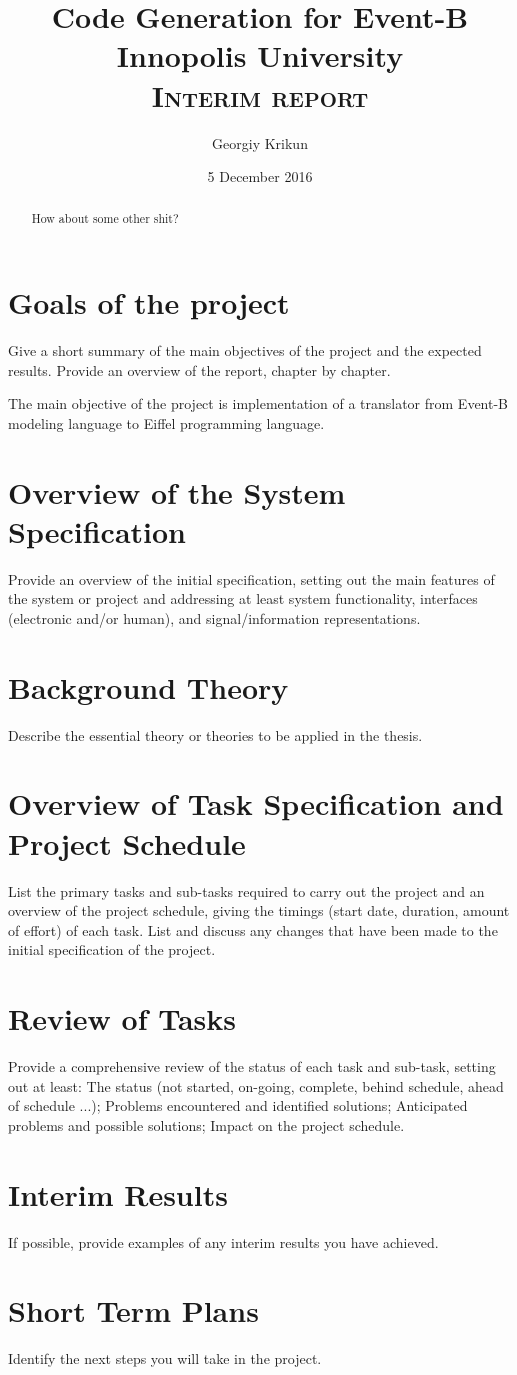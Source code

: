 \documentclass[12pt]{article}
\title{
	{Code Generation for Event-B}\\
	{\large Innopolis University}\\
	{\large \textsc{Interim report}}\\
}
\author{Georgiy Krikun}
\date{5 December 2016}
\begin{document}
\maketitle
\pagebreak
\begin{abstract}
  How about some other shit?
\end{abstract}

\pagebreak
\tableofcontents

\pagebreak

\section{Goals of the project}
Give a short summary of the main objectives of the project and the expected results.
Provide an overview of the report, chapter by chapter.

The main objective of the project is implementation of a translator from Event-B
modeling language to Eiffel programming language.

\section{Overview of the System Specification}
Provide an overview of the initial specification, setting out the main features of the
system or project and addressing at least system functionality, interfaces (electronic
and/or human), and signal/information representations.

\section{Background Theory}
Describe the essential theory or theories to be applied in the thesis.

\section{Overview of Task Specification and Project Schedule}
List the primary tasks and sub-tasks required to carry out the project and an overview
of the project schedule, giving the timings (start date, duration, amount of effort) of
each task. List and discuss any changes that have been made to the initial
specification of the project.

\section{Review of Tasks}
Provide a comprehensive review of the status of each task and sub-task, setting out at
least:
  The status (not started, on-going, complete, behind schedule, ahead of schedule ...);
  Problems encountered and identified solutions;
  Anticipated problems and possible solutions;
  Impact on the project schedule.

\section{Interim Results}
If possible, provide examples of any interim results you have achieved.

\section{Short Term Plans}
Identify the next steps you will take in the project.
\end{document}
